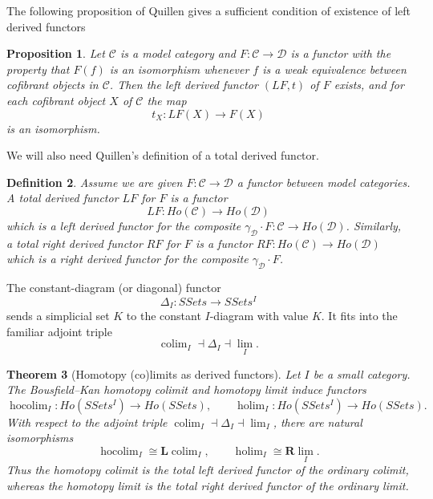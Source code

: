 \documentclass[11pt,a4paper]{article}
\newtheorem{theorem}{Theorem}[section] %
\newtheorem{definition}[theorem]{Definition} %
\newtheorem{proposition}[theorem]{Proposition}
\begin{document}
The following proposition of Quillen \cite[]{Qui1} gives a sufficient condition of existence of left derived functors
\begin{proposition}
Let $\mathcal{C}$ is a model category  and $F:\mathcal{C}\rightarrow \mathcal{D}$ is a functor with the property that $F(f)$ is an isomorphism whenever $f$  is a weak equivalence between cofibrant objects 
in $\mathcal{C}$. Then the left derived functor $(LF,t)$ of $F$ exists, and for each cofibrant object $X$ of $\mathcal{C}$ the map
$$t_X:LF(X)\rightarrow F(X)$$
is an isomorphism.
\end{proposition}
We will also need Quillen's definition of a total derived functor.
\begin{definition}
Assume we are given $F:\mathcal{C}\rightarrow \mathcal{D}$ a functor between model categories. A total derived functor $LF$ for $F$ is a functor 
$$LF: Ho(\mathcal{C})\rightarrow Ho(\mathcal{D})$$
which is a left derived functor for the composite $\gamma_{\mathcal{D}}\cdot F: \mathcal{C}\rightarrow Ho(\mathcal{D})$.
Similarly, a total right derived functor $RF$ for $F$ is a functor $RF: Ho(\mathcal{C})\rightarrow Ho(\mathcal{D})$ which is a right derived functor for the composite $\gamma_{\mathcal{D}}\cdot F$.
\end{definition}

The constant-diagram (or diagonal) functor
\[
\Delta_I:SSets\longrightarrow SSets^I
\]
sends a simplicial set $K$ to the constant $I$-diagram with value $K$.
It fits into the familiar adjoint triple
\[
 \operatorname{colim}_I\dashv \Delta_I\dashv \operatorname{lim}_I.
\]

\begin{theorem}[Homotopy (co)limits as derived functors]
\label{thm:derived-holim-hocolim}
Let $I$ be a small category.  The Bousfield--Kan homotopy colimit and
homotopy limit induce functors
\[
 \operatorname{hocolim}_I:Ho(SSets^I)\longrightarrow Ho(SSets),
 \qquad
 \operatorname{holim}_I:Ho(SSets^I)\longrightarrow Ho(SSets).
\]
With respect to the adjoint triple
$\operatorname{colim}_I\dashv\Delta_I\dashv\operatorname{lim}_I$, there
are natural isomorphisms
\[
 \operatorname{hocolim}_I\cong \mathbf L\operatorname{colim}_I,
 \qquad
 \operatorname{holim}_I\cong \mathbf R\operatorname{lim}_I.
\]
Thus the homotopy colimit is the total left derived functor of the
ordinary colimit, whereas the homotopy limit is the total right derived
functor of the ordinary limit.
\end{theorem}
\end{document}
